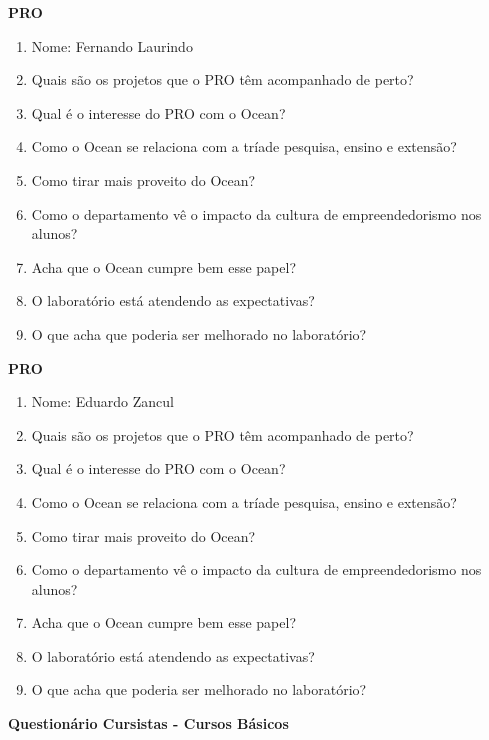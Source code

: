 \begin{apendicesenv}
\clearpage

\textbf{PRO}

\begin{enumerate}
\item Nome: Fernando Laurindo
\item Quais são os projetos que o PRO têm acompanhado de perto?
\item Qual é o interesse do PRO com o Ocean?
\item Como o Ocean se relaciona com a tríade pesquisa, ensino e extensão?
\item Como tirar mais proveito do Ocean?
\item Como o departamento vê o impacto da cultura de empreendedorismo nos alunos?
\item Acha que o Ocean cumpre bem esse papel?
\item O laboratório está atendendo as expectativas?
\item O que acha que poderia ser melhorado no laboratório?
\end{enumerate}

\clearpage

\textbf{PRO}

\begin{enumerate}
\item Nome: Eduardo Zancul
\item Quais são os projetos que o PRO têm acompanhado de perto?
\item Qual é o interesse do PRO com o Ocean?
\item Como o Ocean se relaciona com a tríade pesquisa, ensino e extensão?
\item Como tirar mais proveito do Ocean?
\item Como o departamento vê o impacto da cultura de empreendedorismo nos alunos?
\item Acha que o Ocean cumpre bem esse papel?
\item O laboratório está atendendo as expectativas?
\item O que acha que poderia ser melhorado no laboratório?
\end{enumerate}

\clearpage

\textbf{Questionário Cursistas - Cursos Básicos}


\end{apendicesenv}
